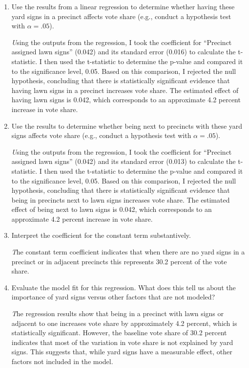 \documentclass[12pt,letterpaper]{article}
\begin{document}
\vspace{.5cm}
\begin{enumerate}
	\item [(a)] Use the results from a linear regression to determine whether having these yard signs in a precinct affects vote share (e.g., conduct a hypothesis test with $\alpha = .05$).
	
		
		
			\textit Using the outputs from the regression, I took the coefficient for “Precinct assigned lawn signs” (0.042) and its standard error (0.016) to calculate the t-statistic. I then used the t-statistic to determine the p-value and compared it to the significance level, 0.05. Based on this comparison, I rejected the null hypothesis, concluding that there is statistically significant evidence that having lawn signs in a precinct increases vote share. The estimated effect of having lawn signs is 0.042, which corresponds to an approximate 4.2 percent increase in vote share. 
	
	\newpage		
	\item [(b)]  Use the results to determine whether being
	next to precincts with these yard signs affects vote
	share (e.g., conduct a hypothesis test with $\alpha = .05$).
	
	
	
	
		\textit Using the outputs from the regression, I took the coefficient for “Precinct assigned lawn signs” (0.042) and its standard error (0.013) to calculate the t-statistic. I then used the t-statistic to determine the p-value and compared it to the significance level, 0.05. Based on this comparison, I rejected the null hypothesis, concluding that there is statistically significant evidence that being in precincts next to lawn signs increases vote share. The estimated effect of being next to lawn signs is 0.042, which corresponds to an approximate 4.2 percent increase in vote share. 
	
	
	\vspace{7cm}
	\item [(c)] Interpret the coefficient for the constant term substantively.
	\vspace{7cm}
	
	\textit The constant term coefficient indicates that when there are no yard signs in a precinct or in adjacent precincts this represents 30.2 percent of the vote share. 
	
	\item [(d)] Evaluate the model fit for this regression.  What does this	tell us about the importance of yard signs versus other factors that are not modeled?
	
		\textit The regression results show that being in a precinct with lawn signs or adjacent to one increases vote share by approximately 4.2 percent, which is statistically significant. However, the baseline vote share of 30.2 percent indicates that most of the variation in vote share is not explained by yard signs. This suggests that, while yard signs have a measurable effect, other factors not included in the model.
	
\end{enumerate}  
\end{document}
